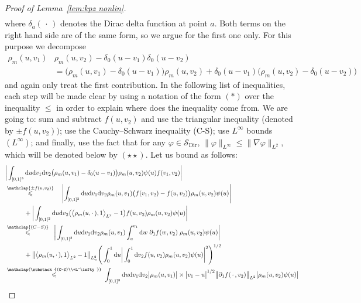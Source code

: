 \documentclass[10pt]{amsart}
\theoremstyle{definition}\newtheorem{defi}[theo]{Definition}\newtheorem{rema}[theo]{Remark}\newtheorem{exam}[theo]{Example}\newtheorem{exem}[theo]{Example}\newtheorem{nota}[theo]{Notation}
\DeclareMathOperator{\Dir}{Dir}
\newcommand{\mc}[1]{{\mathcal #1}}
\renewcommand{\mc}[1]{{\mathcal #1}}
\newcommand{\Ctwo}{\ensuremath{\mc S_{\Dir}}}
\renewcommand{\leq}{\leqslant}
\newcommand*{\dd}{\mathrm{d}}
\newcommand*{\du}{\dd u}
\newcommand*{\dv}{\dd v}
\newcommand*{\dw}{\dd w}
\begin{document}
\begin{proof}[Proof of Lemma~\ref{lem:kpz nonlin}]
\begin{align*}
\end{align*}
where $\delta_a({\,\cdot\,})$ denotes the Dirac delta function at point $a$. Both terms on the right hand side are of the same form, so we argue for the first one only. For this purpose we decompose
\begin{align*}
\rho_m (u, v_1) &\rho_m (u, v_2) - \delta_0(u - v_1) \delta_0(u - v_2)\\
&= \big(\rho_m (u, v_1) - \delta_0(u - v_1)\big) \rho_m (u, v_2) + \delta_0(u - v_1)
\big(\rho_m (u, v_2) - \delta_0(u - v_2)\big)
\end{align*}
and again only treat the first contribution. In the following list of inequalities, each step will be made clear by using a notation of the form $(*)$ over the inequality $\leq$ in order to explain where does the inequality come from. We are going to: sum and subtract $f(u,v_2)$ and use the triangular inequality (denoted by $\pm f(u,v_2))$; use the Cauchy--Schwarz inequality (C-S); use $L^\infty$ bounds $(L^\infty)$; and finally, use the fact that for any $\varphi \in \Ctwo$, $\|\varphi\|_{L^\infty} \leqslant \|\nabla\varphi\|_{L^2}$, which will be denoted below by $(\star\star)$. Let us bound as follows:
\begingroup
\allowdisplaybreaks
\begin{align*}
&\bigg| \int_{[0, 1]^3} \du \dv_1 \dv_2 \big(\rho_m (u, v_1) -
\delta_0(u- v_1)\big) \rho_m (u, v_2) \psi (u) f (v_1, v_2) \bigg|\\
&\overset{\mathclap{\pm f(u,v_2)}}{\leq}\quad \left| \int_{[0, 1]^3} \du \dv_1 \dv_2 \rho_m (u, v_1) \big(f (v_1, v_2) - f (u, v_2)\big) \rho_m (u, v_2) \psi (u) \right|\\*
&\qquad \quad + \bigg| \int_{[0, 1]^2} \du \dv_2 \big(\big\langle \rho_m (u, \cdot\,), 1 \big\rangle_{L^2} - 1\big) f (u, v_2) \rho_m (u, v_2) \psi (u) \bigg|\\
&\overset{\mathclap{(C-S)}}{\leq} \;\;\bigg| \int_{[0, 1]^3} \du \dv_1 \dv_2 \rho_m (u, v_1) \int_u^{v_1}\dw\; \partial_1 f (w, v_2)\; \rho_m (u, v_2) \psi (u) \bigg|\\*
&\qquad \quad+ \big\| \big\langle \rho_m (u, \cdot\,), 1 \big\rangle_{L^2} - 1 \big\|_{L^2_u} \Bigg(\int_0^1 \du \bigg| \int_0^1 \dv_2 f (u, v_2) \rho_m (u, v_2) \psi (u)
\bigg|^2 \Bigg)^{1/2}\\
&\overset{\mathclap{\substack{(C-S)\\+L^\infty}}}{\leq}\; \int_{[0, 1]^3} \du \dv_1 \dv_2 \big| \rho_m (u, v_1)\big| \times \big| v_1 - u \big|^{1/2} \big\| \partial_1 f(\,\cdot\,,v_2) \big\|_{L^2} \big| \rho_m (u, v_2) \psi (u) \big|\\*

\end{align*}
\end{proof}
\end{document}
